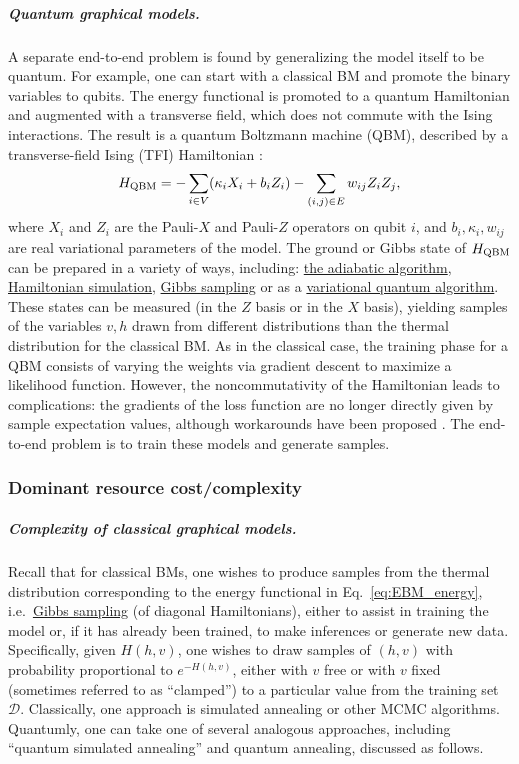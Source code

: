 \begin{refsection}
\subparagraph{Quantum graphical models.} A separate end-to-end problem is found by generalizing the model itself to be quantum. For example, one can start with a classical BM and promote the binary variables to qubits. The energy functional is promoted to a quantum Hamiltonian and augmented with a transverse field, which does not commute with the Ising interactions.
The result is a quantum Boltzmann machine (QBM), described by a transverse-field Ising (TFI) Hamiltonian \cite{amin2016QBoltzMachine}: 
\begin{equation}\label{eq:QBM_energy}
    H_{\rm QBM}= -\sum_{i\in V}(\kappa_i X_i +b_i Z_i) -\sum_{(i,j)\in E} w_{ij} Z_i Z_j,
\end{equation}
where $X_i$ and $Z_i$ are the Pauli-$X$ and Pauli-$Z$ operators on qubit $i$, and $b_i, \kappa_i, w_{ij}$ are real variational parameters of the model. 
The ground or Gibbs state of $H_{\rm QBM}$ can be prepared in a variety of ways, including: \hyperref[prim:QuantumAdiabaticAlgorithm]{the adiabatic algorithm}, \hyperref[prim:HamiltonianSimulation]{Hamiltonian simulation}, \hyperref[prim:GibbsSampling]{Gibbs sampling} or as a \hyperref[prim:VQA]{variational quantum algorithm}. These states can be measured (in the $Z$ basis or in the $X$ basis), yielding samples of the variables $v,h$ drawn from different distributions than the thermal distribution for the classical BM. 
As in the classical case, the training phase for a QBM consists of varying the weights via gradient descent to maximize a likelihood function. However, the noncommutativity of the Hamiltonian leads to complications: the gradients of the loss function are no longer directly given by sample expectation values, although workarounds have been proposed \cite{amin2016QBoltzMachine,kieferova2016tomographyTrainQBoltzMachine,wiebe2019generativeQBM,anschuetz2019realizing,zoufal2021variationalQBM}. The end-to-end problem is to train these models and generate samples. 



\subsubsection*{Dominant resource cost/complexity}
 
\subparagraph{Complexity of classical graphical models.}
Recall that for classical BMs, one wishes to produce samples from the thermal distribution corresponding to the energy functional in Eq.~\eqref{eq:EBM_energy}, i.e.~\hyperref[prim:GibbsSampling]{Gibbs sampling} (of diagonal Hamiltonians), either to assist in training the model or,  if it has already been trained, to make inferences or generate new data. Specifically, given $H(h,v)$, one wishes to draw samples of $(h,v)$ with probability proportional to $e^{-H(h,v)}$, either with $v$ free or with $v$ fixed (sometimes referred to as ``clamped'') to a particular value from the training set $\mathcal{D}$. Classically, one approach is simulated annealing or other MCMC algorithms. Quantumly, one can take one of several analogous approaches, including ``quantum simulated annealing'' \cite{somma2007QuantumSimulatedAnnealing} and quantum annealing, discussed as follows. 


\end{refsection}
